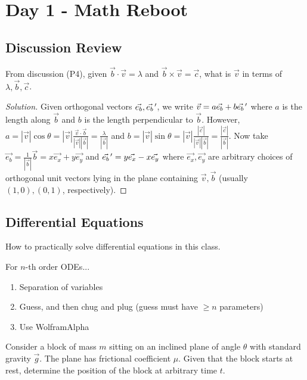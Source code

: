 \section{Day 1 - Math Reboot}

\subsection{Discussion Review}

\begin{prb}
From discussion (P4), given $\vec{b} \cdot \vec{v} = \lambda$ and $\vec{b}
\times \vec{v} = \vec{c}$, what is $\vec{v}$ in terms of $\lambda,
\vec{b}, \vec{c}$.
\end{prb}

\begin{proof}[Solution]
Given orthogonal vectors $\vec{e_b}, \pvec{e_b}'$, we write $\vec{v} = a
\vec{e_b} + b \pvec{e_b}'$ where $a$ is the length along $\vec{b}$ and
$b$ is the length perpendicular to $\vec{b}$. However, $a = |\vec{v}|
\cos \theta = |\vec{v}| \frac{\vec{v} \cdot \vec{b}}{|\vec{v}|
|\vec{b}|} = \frac{\lambda}{|\vec{b}|}$ and $b = |\vec{v}| \sin \theta =
|\vec{v}| \frac{|\vec{c}|}{|\vec{v}| |\vec{b}|} =
\frac{|\vec{c}|}{|\vec{b}|}$. Now take $\vec{e_b} = \frac{1}{|\vec{b}|}
\vec{b} = x \vec{e_x} + y \vec{e_y}$ and $\pvec{e_b}' = y \vec{e_x} - x
\vec{e_y}$ where $\vec{e_x}, \vec{e_y}$ are arbitrary choices of
orthogonal unit vectors lying in the plane containing $\vec{v}, \vec{b}$
(usually $(1, 0), (0, 1)$, respectively).
\end{proof}

\subsection{Differential Equations}

How to practically solve differential equations in this class.

For $n$-th order ODEs...
\begin{enumerate}
\item Separation of variables
\item Guess, and then chug and plug (guess must have $\geq n$
parameters)
\item Use Wolfram{\textbar}Alpha
\end{enumerate}

\begin{prb}
Consider a block of mass $m$ sitting on an inclined plane of angle
$\theta$ with standard gravity $\vec{g}$. The plane has frictional
coefficient $\mu$. Given that the block starts at rest, determine the
position of the block at arbitrary time $t$.
\end{prb}

